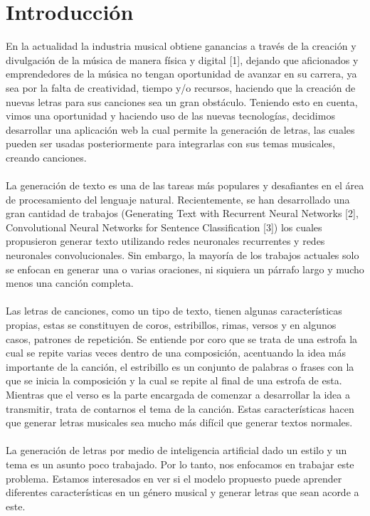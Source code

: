 \section{Introducción}

  En la actualidad la industria musical obtiene ganancias a través de la creación y divulgación de la música de manera física y digital [1], dejando que aficionados y emprendedores de la música no tengan oportunidad de avanzar en su carrera, ya sea por la falta de creatividad, tiempo y/o recursos, haciendo que la creación de nuevas letras para sus canciones sea un gran obstáculo.
  Teniendo esto en cuenta, vimos una oportunidad y haciendo uso de las nuevas tecnologías, decidimos desarrollar una aplicación web la cual permite la generación de letras, las cuales pueden ser usadas posteriormente para integrarlas con sus temas musicales, creando canciones.\\\\
  La generación de texto es una de las tareas más populares y desafiantes en el área de procesamiento del lenguaje natural. Recientemente, se han desarrollado una gran cantidad de trabajos (Generating Text with Recurrent Neural Networks [2], Convolutional Neural Networks for Sentence Classification [3]) los cuales propusieron generar texto utilizando redes neuronales recurrentes y redes neuronales convolucionales. Sin embargo, la mayoría de los trabajos actuales solo se enfocan en generar una o varias oraciones, ni siquiera un párrafo largo y mucho menos una canción completa.\\\\
  Las letras de canciones, como un tipo de texto, tienen algunas características propias, estas se constituyen de coros, estribillos, rimas, versos y en algunos casos, patrones de repetición. Se entiende por coro que se trata de una estrofa la cual se repite varias veces dentro de una composición, acentuando la idea más importante de la canción, el estribillo es un conjunto de palabras o frases con la que se inicia la composición y la cual se repite al final de una estrofa de esta. Mientras que el verso es la parte encargada de comenzar a desarrollar la idea a transmitir, trata de contarnos el tema de la canción. Estas características hacen que generar letras musicales sea mucho más difícil que generar textos normales.\\\\
  La generación de letras por medio de inteligencia artificial dado un estilo y un tema es un asunto poco trabajado. Por lo tanto, nos enfocamos en trabajar este problema. Estamos interesados en ver si el modelo propuesto puede aprender diferentes características en un género musical y generar letras que sean acorde a este.
  